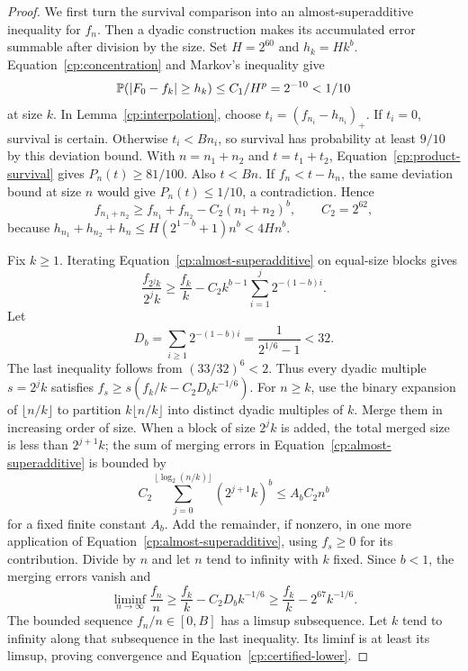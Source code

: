 \begin{proof}
We first turn the survival comparison into an almost-superadditive
inequality for $f_n$. Then a dyadic construction makes its accumulated
error summable after division by the size.
Set $H=2^{60}$ and $h_k=Hk^b$. Equation~\eqref{cp:concentration} and
Markov's inequality give
\[
 \mathbb P(|F_0-f_k|\ge h_k)
 \le C_1/H^p=2^{-10}<1/10
\]
at size $k$. In Lemma~\ref{cp:interpolation}, choose
$t_i=(f_{n_i}-h_{n_i})_+$. If $t_i=0$, survival is certain. Otherwise
$t_i<Bn_i$, so survival has probability at least $9/10$ by this deviation
bound. With $n=n_1+n_2$ and $t=t_1+t_2$, Equation~\eqref{cp:product-survival}
gives $P_n(t)\ge81/100$. Also $t<Bn$. If $f_n<t-h_n$, the same deviation
bound at size $n$ would give $P_n(t)\le1/10$, a contradiction. Hence
\begin{equation}\label{cp:almost-superadditive}
 f_{n_1+n_2}\ge f_{n_1}+f_{n_2}-C_2(n_1+n_2)^b,
 \qquad C_2=2^{62},
\end{equation}
because $h_{n_1}+h_{n_2}+h_n\le H(2^{1-b}+1)n^b<4Hn^b$.

Fix $k\ge1$. Iterating Equation~\eqref{cp:almost-superadditive} on
equal-size blocks gives
\[
 \frac{f_{2^jk}}{2^jk}
 \ge\frac{f_k}{k}
 -C_2k^{b-1}\sum_{i=1}^j2^{-(1-b)i}.
\]
Let
\[
 D_b=\sum_{i\ge1}2^{-(1-b)i}
 =\frac1{2^{1/6}-1}<32.
\]
The last inequality follows from $(33/32)^6<2$.
Thus every dyadic multiple $s=2^jk$ satisfies
$f_s\ge s(f_k/k-C_2D_bk^{-1/6})$.
For $n\ge k$, use the binary expansion of $\lfloor n/k\rfloor$ to
partition $k\lfloor n/k\rfloor$ into distinct dyadic multiples of $k$.
Merge them in increasing order of size. When a block of size $2^jk$ is
added, the total merged size is less than $2^{j+1}k$; the sum of merging
errors in Equation~\eqref{cp:almost-superadditive} is bounded by
\[
 C_2\sum_{j=0}^{\lfloor\log_2(n/k)\rfloor}(2^{j+1}k)^b
 \le A_b C_2 n^b
\]
for a fixed finite constant $A_b$. Add the remainder, if nonzero, in one
more application of Equation~\eqref{cp:almost-superadditive}, using
$f_s\ge0$ for its contribution. Divide by $n$ and let $n$ tend to
infinity with $k$ fixed. Since $b<1$, the merging errors vanish and
\[
 \liminf_{n\to\infty}\frac{f_n}{n}
 \ge\frac{f_k}{k}-C_2D_bk^{-1/6}
 \ge\frac{f_k}{k}-2^{67}k^{-1/6}.
\]
The bounded sequence $f_n/n\in[0,B]$ has a limsup subsequence. Let $k$
tend to infinity along that subsequence in the last inequality. Its
liminf is at least its limsup, proving convergence and
Equation~\eqref{cp:certified-lower}.
\end{proof}

